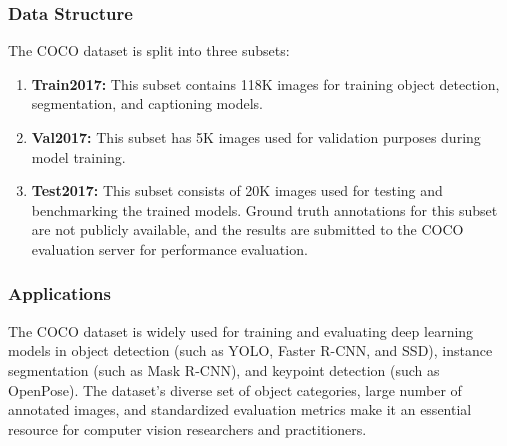         \subsubsection{Data Structure}
            The COCO dataset is split into three subsets:
            \begin{enumerate}
                \item \textbf{Train2017:} This subset contains 118K images for training object detection, segmentation, and captioning models.
                \item \textbf{Val2017:} This subset has 5K images used for validation purposes during model training.
                \item \textbf{Test2017:} This subset consists of 20K images used for testing and benchmarking the trained models. Ground truth annotations for this subset are not publicly available, and the results are submitted to the COCO evaluation server for performance evaluation.
            \end{enumerate}
        \subsubsection{Applications}
            The COCO dataset is widely used for training and evaluating deep learning models in object detection (such as YOLO, Faster R-CNN, and SSD), instance segmentation (such as Mask R-CNN), and keypoint detection (such as OpenPose). The dataset's diverse set of object categories, large number of annotated images, and standardized evaluation metrics make it an essential resource for computer vision researchers and practitioners.
